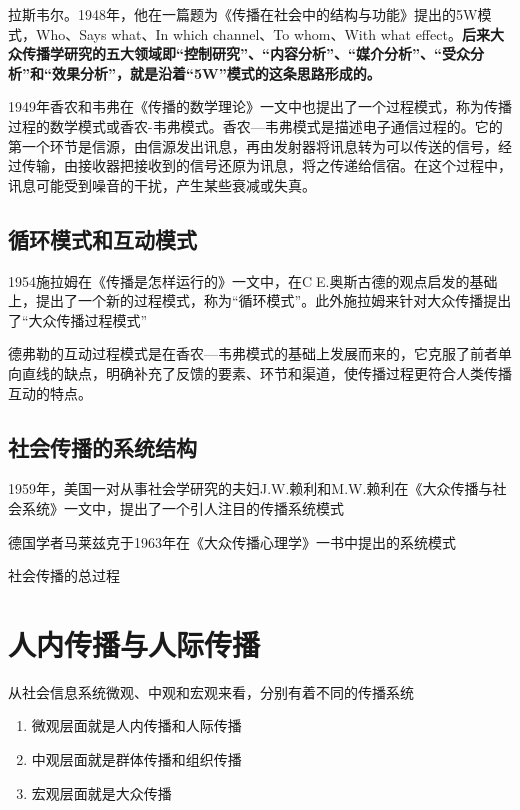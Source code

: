 \documentclass[UTF8,12pt]{ctexart}
\numberwithin{equation}{section} %
\numberwithin{figure}{section}
\numberwithin{table}{section}
\begin{document}
	拉斯韦尔。1948年，他在一篇题为《传播在社会中的结构与功能》提出的5W模式，Who、Says what、In which channel、To whom、With what effect。\textbf{后来大众传播学研究的五大领域即“控制研究”、“内容分析”、“媒介分析”、“受众分析”和“效果分析”，就是沿着“5W”模式的这条思路形成的。}
	
	1949年香农和韦弗在《传播的数学理论》一文中也提出了一个过程模式，称为传播过程的数学模式或香农-韦弗模式。香农—韦弗模式是描述电子通信过程的。它的第一个环节是信源，由信源发出讯息，再由发射器将讯息转为可以传送的信号，经过传输，由接收器把接收到的信号还原为讯息，将之传递给信宿。在这个过程中，讯息可能受到噪音的干扰，产生某些衰减或失真。
	
	\subsection{循环模式和互动模式}
	
	1954施拉姆在《传播是怎样运行的》一文中，在CE.奥斯古德的观点启发的基础上，提出了一个新的过程模式，称为“循环模式”。此外施拉姆来针对大众传播提出了“大众传播过程模式”
	
	德弗勒的互动过程模式是在香农—韦弗模式的基础上发展而来的，它克服了前者单向直线的缺点，明确补充了反馈的要素、环节和渠道，使传播过程更符合人类传播互动的特点。
	
	
	\subsection{社会传播的系统结构}
	
	1959年，美国一对从事社会学研究的夫妇J.W.赖利和M.W.赖利在《大众传播与社会系统》一文中，提出了一个引人注目的传播系统模式
	
	德国学者马莱兹克于1963年在《大众传播心理学》一书中提出的系统模式
	
	社会传播的总过程
	
	\newpage
	
	\section{人内传播与人际传播}
	
	从社会信息系统微观、中观和宏观来看，分别有着不同的传播系统
	\begin{enumerate}
		\item 微观层面就是人内传播和人际传播
		
		\item 中观层面就是群体传播和组织传播
		
		\item 宏观层面就是大众传播
	\end{enumerate}
	
\end{document}
